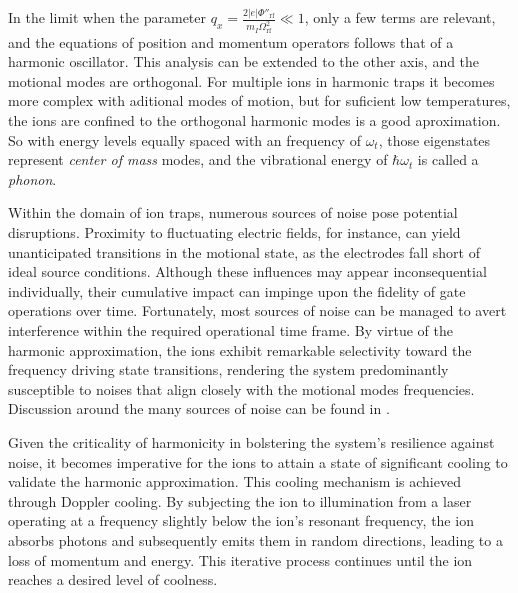 \documentclass[
  journal=largetwo,
  year=2023,
]{cup-journal}
\begin{document}
\noindent In the limit when the parameter \( q_x = \frac{2|e|\Phi''_{\mathrm{rf}}}{m_I \Omega^2_{\mathrm{rf} }} \ll 1\), only a few terms are relevant, and the equations of position and momentum operators follows that of a harmonic oscillator. This analysis can be extended to the other axis, and the motional modes are orthogonal. For multiple ions in harmonic traps it becomes more complex with aditional modes of motion, but for suficient low temperatures, the ions are confined to the orthogonal harmonic modes is a good aproximation.
So with energy levels equally spaced with an frequency of \(\omega_t\), those eigenstates represent {\it center of mass} modes, and the vibrational energy of \(\hbar\omega_t\) is called a {\it phonon}.

Within the domain of ion traps, numerous sources of noise pose potential disruptions. Proximity to fluctuating electric fields, for instance, can yield unanticipated transitions in the motional state, as the electrodes fall short of ideal source conditions. Although these influences may appear inconsequential individually, their cumulative impact can impinge upon the fidelity of gate operations over time. Fortunately, most sources of noise can be managed to avert interference within the required operational time frame. By virtue of the harmonic approximation, the ions exhibit remarkable selectivity toward the frequency driving state transitions, rendering the system predominantly susceptible to noises that align closely with the motional modes frequencies.
Discussion around the many sources of noise can be found in \autocite{brownnutt_2015_iontrap}.

Given the criticality of harmonicity in bolstering the system's resilience against noise, it becomes imperative for the ions to attain a state of significant cooling to validate the harmonic approximation. This cooling mechanism is achieved through Doppler cooling. By subjecting the ion to illumination from a laser operating at a frequency slightly below the ion's resonant frequency, the ion absorbs photons and subsequently emits them in random directions, leading to a loss of momentum and energy. This iterative process continues until the ion reaches a desired level of coolness.

\noindent
\end{document}
